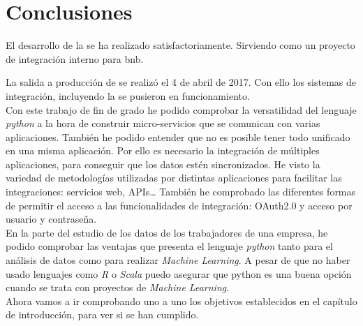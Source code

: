 \chapter{Conclusiones}

El desarrollo de la \iface{} se ha realizado satisfactoriamente. Sirviendo como un proyecto de integración interno para \acrshort{bnb}.

La salida a producción de \wday{} se realizó el 4 de abril de 2017. Con ello los sistemas de integración, incluyendo la \iface{} se pusieron en funcionamiento.\\



Con este trabajo de fin de grado he podido comprobar la versatilidad del lenguaje \textit{python} a la hora de construir micro-servicios que se comunican con varias aplicaciones.
También he podido entender que no es posible tener todo unificado en una misma aplicación. Por ello es necesario la integración de múltiples aplicaciones, para conseguir que los datos estén sincronizados.
He visto la variedad de metodologías utilizadas por distintas aplicaciones para facilitar las integraciones: servicios web, APIs\ldots
También he comprobado las diferentes formas de permitir el acceso a las funcionalidades de integración: OAuth2.0 y acceso por usuario y contraseña.\\



En la parte del estudio de los datos de los trabajadores de una empresa, he podido comprobar las ventajas que presenta el lenguaje \textit{python} tanto para el análisis de datos como para realizar \textit{Machine Learning}.
A pesar de que no haber usado lenguajes como \textit{R} o \textit{Scala} puedo asegurar que python es una buena opción cuando se trata con proyectos de \textit{Machine Learning}.\\


Ahora vamos a ir comprobando uno a uno los objetivos establecidos en el capítulo de introducción, para ver si se han cumplido.

